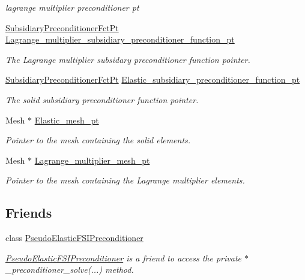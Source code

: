 \begin{DoxyCompactItemize}
\begin{DoxyCompactList}\small\item\em lagrange multiplier preconditioner pt \end{DoxyCompactList}\item 
\hyperlink{classoomph_1_1PseudoElasticPreconditionerOld_a8ee80a4a55139190a6e2a16fa175e75f}{Subsidiary\+Preconditioner\+Fct\+Pt} \hyperlink{classoomph_1_1PseudoElasticPreconditionerOld_ab010ad3548eec31d287215c63aad1abe}{Lagrange\+\_\+multiplier\+\_\+subsidiary\+\_\+preconditioner\+\_\+function\+\_\+pt}
\begin{DoxyCompactList}\small\item\em The Lagrange multiplier subsidary preconditioner function pointer. \end{DoxyCompactList}\item 
\hyperlink{classoomph_1_1PseudoElasticPreconditionerOld_a8ee80a4a55139190a6e2a16fa175e75f}{Subsidiary\+Preconditioner\+Fct\+Pt} \hyperlink{classoomph_1_1PseudoElasticPreconditionerOld_a48a6c1d213cabb8849b6abcad8415152}{Elastic\+\_\+subsidiary\+\_\+preconditioner\+\_\+function\+\_\+pt}
\begin{DoxyCompactList}\small\item\em The solid subsidiary preconditioner function pointer. \end{DoxyCompactList}\item 
Mesh $\ast$ \hyperlink{classoomph_1_1PseudoElasticPreconditionerOld_ab45147d893d104fbf3c0ebc0bacafc7d}{Elastic\+\_\+mesh\+\_\+pt}
\begin{DoxyCompactList}\small\item\em Pointer to the mesh containing the solid elements. \end{DoxyCompactList}\item 
Mesh $\ast$ \hyperlink{classoomph_1_1PseudoElasticPreconditionerOld_aee91427e4d8d57802728291d8576d5a4}{Lagrange\+\_\+multiplier\+\_\+mesh\+\_\+pt}
\begin{DoxyCompactList}\small\item\em Pointer to the mesh containing the Lagrange multiplier elements. \end{DoxyCompactList}\end{DoxyCompactItemize}
\subsection*{Friends}
\begin{DoxyCompactItemize}
\item 
class \hyperlink{classoomph_1_1PseudoElasticPreconditionerOld_aaaea2b4795566f81945597254305249d}{Pseudo\+Elastic\+F\+S\+I\+Preconditioner}
\begin{DoxyCompactList}\small\item\em \hyperlink{classoomph_1_1PseudoElasticFSIPreconditioner}{Pseudo\+Elastic\+F\+S\+I\+Preconditioner} is a friend to access the private $\ast$\+\_\+preconditioner\+\_\+solve(...) method. \end{DoxyCompactList}\end{DoxyCompactItemize}


